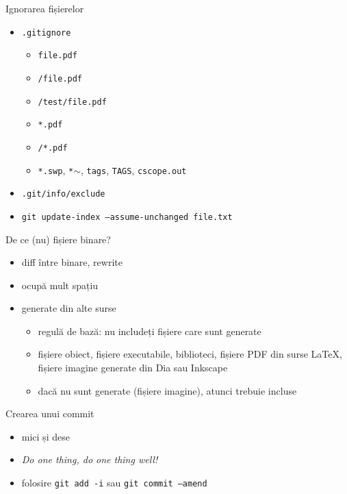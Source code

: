 \documentclass{beamer}
\begin{document}
\begin{frame}{Ignorarea fișierelor}
  \begin{itemize}
    \item \texttt{.gitignore}
      \begin{itemize}
	\item \texttt{file.pdf}
	\item \texttt{/file.pdf}
	\item \texttt{/test/file.pdf}
	\item \texttt{*.pdf}
	\item \texttt{/*.pdf}
	\item \texttt{*.swp}, \texttt{*$\sim$}, \texttt{tags}, \texttt{TAGS},
	  \texttt{cscope.out}
      \end{itemize}
    \item \texttt{.git/info/exclude}
    \item \texttt{git update-index --assume-unchanged file.txt}
  \end{itemize}
\end{frame}

\begin{frame}{De ce (nu) fișiere binare?}
  \begin{itemize}
    \item diff între binare, rewrite
    \item ocupă mult spațiu
    \item generate din alte surse
      \begin{itemize}
        \item regulă de bază: nu includeți fișiere care sunt generate
	\item fișiere obiect, fișiere executabile, biblioteci, fișiere PDF din
	  surse \LaTeX, fișiere imagine generate din Dia sau Inkscape
	\item dacă nu sunt generate (fișiere imagine), atunci trebuie incluse
      \end{itemize}
  \end{itemize}
\end{frame}

\begin{frame}{Crearea unui commit}
  \begin{itemize}
    \item mici și dese
    \item \textit{Do one thing, do one thing well!}
    \item folosire \texttt{git add -i} sau \texttt{git commit --amend}
  \end{itemize}
\end{frame}
\end{document}
